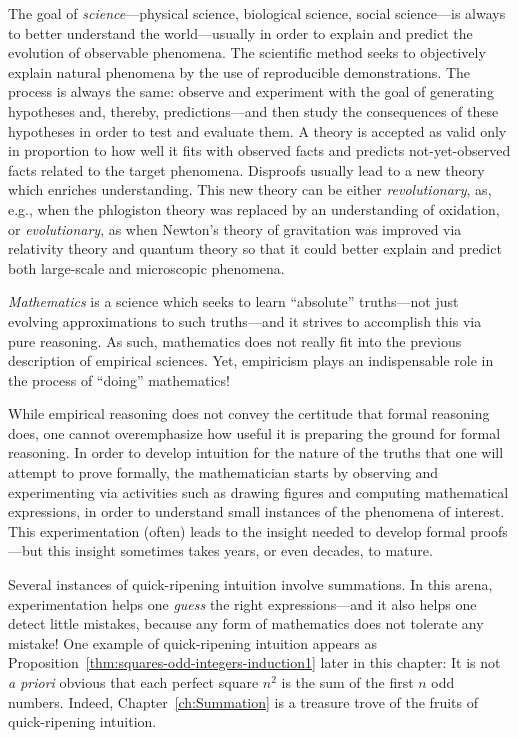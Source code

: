 The goal of {\em science}---physical science, biological science, social science---is always to better understand the world---usually in order to explain and predict the evolution of observable phenomena.  The scientific method seeks to objectively explain natural phenomena by the use of reproducible demonstrations.  The process is always the same: observe and experiment with the goal of generating hypotheses and, thereby, predictions---and then study the consequences of these hypotheses in order to test and evaluate them.  A theory is accepted as valid only in proportion to how well it fits with observed facts and predicts not-yet-observed facts related to the target phenomena.  Disproofs usually lead to a new theory which enriches understanding.
This new theory can be either {\em revolutionary}, as, e.g., when the phlogiston theory was replaced by an understanding of oxidation, or {\em evolutionary}, as when Newton's theory of gravitation was improved via relativity theory and quantum theory so that it could better explain and predict both large-scale and microscopic phenomena.

\smallskip

{\em Mathematics} is a science which seeks to learn ``absolute'' truths---not just evolving approximations to such truths---and it strives to accomplish this via pure reasoning.  As such, mathematics does not really fit into the previous description of empirical sciences.  Yet, empiricism plays an indispensable role in the process of ``doing'' mathematics!

While empirical reasoning does not convey the certitude that formal reasoning does, one cannot overemphasize how useful it is preparing the ground for formal reasoning.  In order to develop intuition for the nature of the truths that one will attempt to prove formally, the mathematician starts by observing and experimenting via activities such as drawing figures and computing mathematical expressions, in order to understand small instances of the phenomena of interest. This experimentation (often) leads to the insight needed to develop formal proofs---but this insight sometimes takes years, or even decades, to mature.

Several instances of quick-ripening intuition involve summations.  In this arena, experimentation helps one \textit{guess} the right expressions---and it also helps one detect little mistakes, because any form of mathematics does not tolerate any mistake!  One example of quick-ripening intuition appears as Proposition~\ref{thm:squares-odd-integers-induction1} later in this
chapter: It is not {\em a priori} obvious that each perfect square $n^2$ is the sum of the first $n$ odd numbers.  Indeed, Chapter~\ref{ch:Summation} is a treasure trove of the fruits of
quick-ripening intuition.

